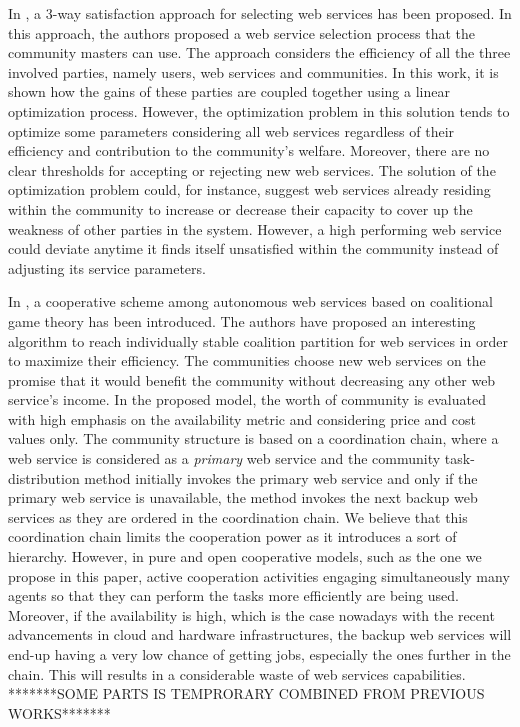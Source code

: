 \documentclass[10pt,journal,cspaper,compsoc]{IEEEtran}
\begin{document}
In \cite{DBLP:conf/IEEEscc/LimTMB12}, a 3-way satisfaction approach
for selecting web services has been proposed. In this approach,
the authors proposed a web service selection process that the
community masters can use. The approach considers the efficiency
of all the three involved parties, namely users, web services and
communities. In this work, it is shown how the gains of these
parties are coupled together using a linear optimization process.
However, the optimization problem in this solution tends to
optimize some parameters considering all web services regardless
of their efficiency and contribution to the community's welfare.
Moreover, there are no clear thresholds for accepting or rejecting
new web services. The solution of the optimization problem could,
for instance, suggest web services already residing within the
community to increase or decrease their capacity to cover up the
weakness of other parties in the system. However, a high
performing web service could deviate anytime it finds itself
unsatisfied within the community instead of adjusting its service
parameters.

In \cite{10.1109/TSC.2012.12}, a cooperative scheme among
autonomous web services based on coalitional game theory has been
introduced. The authors have proposed an interesting algorithm to
reach individually stable coalition partition for web services in
order to maximize their efficiency. The communities choose new web
services on the promise that it would benefit the community
without decreasing any other web service's income. In the proposed
model, the worth of community is evaluated with high emphasis on
the availability metric and considering price and cost values
only. The community structure is based on a coordination chain,
where a web service is considered as a \emph{primary} web service
and the community task-distribution method initially invokes the
primary web service and only if the primary web service is
unavailable, the method invokes the next backup web services as
they are ordered in the coordination chain. We believe that this
coordination chain limits the cooperation power as it introduces a
sort of hierarchy. However, in pure and open cooperative models,
such as the one we propose in this paper, active cooperation
activities engaging simultaneously many agents so that they can
perform the tasks more efficiently are being used. Moreover, if
the availability is high, which is the case nowadays with the
recent advancements in cloud and hardware infrastructures, the
backup web services will end-up having a very low chance of
getting jobs, especially the ones further in the chain. This will
results in a considerable waste of web services capabilities.
*******SOME PARTS IS TEMPRORARY COMBINED FROM PREVIOUS WORKS*******
\end{document}
